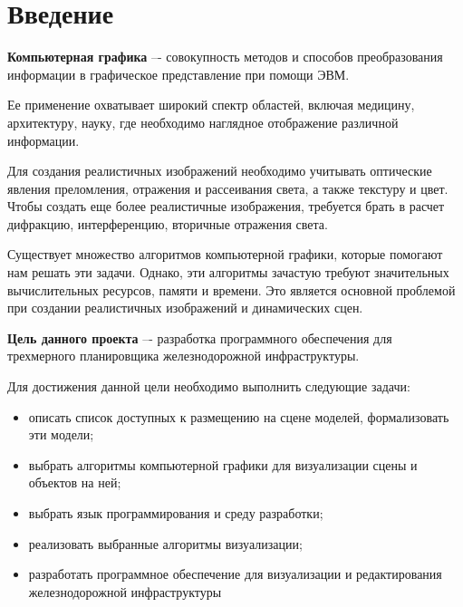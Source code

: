 \chapter*{Введение}

\textbf{Компьютерная графика} –- совокупность методов и способов преобразования информации
в графическое представление при помощи ЭВМ.

Ее применение охватывает широкий спектр областей, включая медицину, 
архитектуру, науку, где необходимо наглядное отображение различной
информации.

Для создания реалистичных изображений необходимо учитывать оптические явления
преломления, отражения и рассеивания света, а также текстуру и цвет. Чтобы создать еще более
реалистичные изображения, требуется брать в расчет дифракцию, интерференцию, вторичные
отражения света.

Существует множество алгоритмов компьютерной графики, которые помогают нам решать
эти задачи. Однако, эти алгоритмы зачастую требуют значительных вычислительных ресурсов,
памяти и времени. Это является основной проблемой при создании реалистичных изображений и
динамических сцен.

\textbf{Цель данного проекта} –- разработка программного обеспечения для трехмерного
планировщика железнодорожной инфраструктуры. 

Для достижения данной цели необходимо выполнить следующие задачи:
\begin{itemize}
    \item описать список доступных к размещению на сцене моделей, формализовать эти модели;
    \item выбрать алгоритмы компьютерной графики для визуализации сцены и
    объектов на ней;
    \item выбрать язык программирования и среду разработки;
    \item реализовать выбранные алгоритмы визуализации;
    \item разработать программное обеспечение для визуализации и редактирования
    железнодорожной инфраструктуры
\end{itemize}

